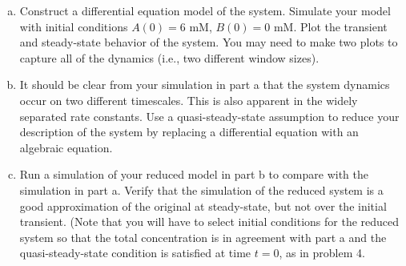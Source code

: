 \documentclass{article}
\begin{document}
\begin{enumerate}[a)]
\setlength{\itemsep}{0pt}
\item Construct a differential equation model of the system. Simulate your model with initial conditions $A(0) = 6$ mM, $B(0) = 0$ mM. Plot the transient and steady-state behavior of the system. You may need to make two plots to capture all of the dynamics (i.e., two different window sizes).
\item It should be clear from your simulation in part a that the system dynamics occur on two different timescales. This is also apparent in the widely separated rate constants. Use a quasi-steady-state assumption to reduce your description of the system by replacing a differential equation with an algebraic equation.
\item Run a simulation of your reduced model in part b to compare with the simulation in part a. Verify that the simulation of the reduced system is a good approximation of the original at steady-state, but not over the initial transient. (Note that you will have to select initial conditions for the reduced system so that the total concentration is in agreement  with part a and the quasi-steady-state condition is satisfied at time $t=0$, as in problem 4.
\end{enumerate}
\end{document}
